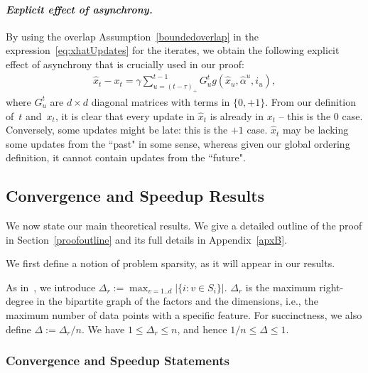 \documentclass[twoside, 11pt]{article}
\newcommand{\stepsize}{\gamma}
\newcommand{\overlap}{\tau}
\newcommand{\sparsity}{\Delta}
\newcommand{\sparsityr}{\Delta_r}
\begin{document}
\paragraph{\textit{Explicit effect of asynchrony.}}
By using the overlap Assumption~\ref{boundedoverlap} in the expression~\eqref{eq:xhatUpdates} for the iterates, we obtain the following explicit effect of asynchrony that is crucially used in our proof:
\begin{align}\label{eq:async}
\hat x_t - x_t = \stepsize \sum_{u=(t - \overlap)_+}^{t-1}G_{u}^t g(\hat x_{u}, \hat \alpha^u, i_{u}),
\end{align}
where $G_{u}^t$ are $d\times d$ diagonal matrices with terms in $\{0, +1\}$.
From our definition of~$t$ and~$x_t$, it is clear that every update in $\hat x_t$ is already in $x_t$ -- this is the $0$ case.
Conversely, some updates might be late: this is the $+1$ case.
$\hat x_t$ may be lacking some updates from the ``past" in some sense, whereas given our global ordering definition, it cannot contain updates from the ``future".

\subsection{Convergence and Speedup Results}
We now state our main theoretical results. We give a detailed outline of the proof in Section~\ref{proofoutline} and its full details in Appendix~\ref{apxB}.

We first define a notion of problem sparsity, as it will appear in our results.

\begin{definition}[Sparsity]
As in~\citet{hogwild}, we introduce $\sparsityr := \max_{v=1..d} |\{i : v \in S_i\}|$. $\sparsityr$ is
the maximum right-degree in the bipartite graph of the factors and the dimensions, i.e.,
the maximum number of data points with a specific feature. For succinctness, we also define $\sparsity := \sparsityr / n$. We have $1 \leq \sparsityr \leq n$, and hence $1/n \leq \sparsity \leq 1$.
\end{definition}

\subsubsection{Convergence and Speedup Statements}
\end{document}
